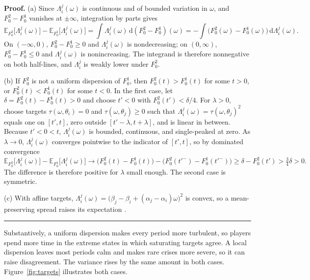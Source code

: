 \documentclass[12pt,letterpaper]{article}
\newenvironment{proof}[1][Proof]{\noindent\textbf{#1.} }{\ \rule{0.5em}{0.5em}}
\begin{document}
\begin{proof}
(a) Since $\Lambda_i^j(\omega)$ is continuous and of bounded variation in $\omega$, and $F_0^2-F_0^1$ vanishes at $\pm\infty$, integration by parts gives
\[
\mathbb{E}_{F_0^2}\big[\Lambda_i^j(\omega)\big]-\mathbb{E}_{F_0^1}\big[\Lambda_i^j(\omega)\big]=\int\Lambda_i^j(\omega)\,\mathrm{d}(F_0^2-F_0^1)(\omega)=-\int\big(F_0^2(\omega)-F_0^1(\omega)\big)\,\mathrm{d}\Lambda_i^j(\omega).
\]
On $(-\infty,0)$, $F_0^2-F_0^1\ge0$ and $\Lambda_i^j(\omega)$ is nondecreasing; on $(0,\infty)$, $F_0^2-F_0^1\le0$ and $\Lambda_i^j(\omega)$ is nonincreasing. The integrand is therefore nonnegative on both half-lines, and $\Lambda_i^j$ is weakly lower under $F_0^2$.

(b) If $F_0^2$ is not a uniform dispersion of $F_0^1$, then $F_0^2(t)>F_0^1(t)$ for some $t>0$, or $F_0^2(t)<F_0^1(t)$ for some $t<0$. In the first case, let $\delta=F_0^2(t)-F_0^1(t)>0$ and choose $t'<0$ with $F_0^2(t')<\delta/4$. For $\lambda>0$, choose targets $\tau(\omega,\theta_i)=0$ and $\tau(\omega,\theta_j)\ge0$ such that $\Lambda_i^j(\omega)=\tau(\omega,\theta_j)^2$ equals one on $[t',t]$, zero outside $[t'-\lambda,t+\lambda]$, and is linear in between. Because $t'<0<t$, $\Lambda_i^j(\omega)$ is bounded, continuous, and single-peaked at zero. As $\lambda\to0$, $\Lambda_i^j(\omega)$ converges pointwise to the indicator of $[t',t]$, so by dominated convergence
\[
\mathbb{E}_{F_0^2}\big[\Lambda_i^j(\omega)\big]-\mathbb{E}_{F_0^1}\big[\Lambda_i^j(\omega)\big]\to\big(F_0^2(t)-F_0^1(t)\big)-\big(F_0^2(t'^-)-F_0^1(t'^-)\big)\ge\delta-F_0^2(t')>\tfrac34\delta>0.
\]
The difference is therefore positive for $\lambda$ small enough. The second case is symmetric.

(c) With affine targets, $\Lambda_i^j(\omega)=\big(\beta_j-\beta_i+(\alpha_j-\alpha_i)\omega\big)^2$ is convex, so a mean-preserving spread raises its expectation \citep{RothschildStiglitz1970}.
\end{proof}

Substantively, a uniform dispersion makes every period more turbulent, so players spend more time in the extreme states in which saturating targets agree. A local dispersion leaves most periods calm and makes rare crises more severe, so it can raise disagreement. The variance rises by the same amount in both cases. Figure~\ref{fig:targets} illustrates both cases.
\end{document}
